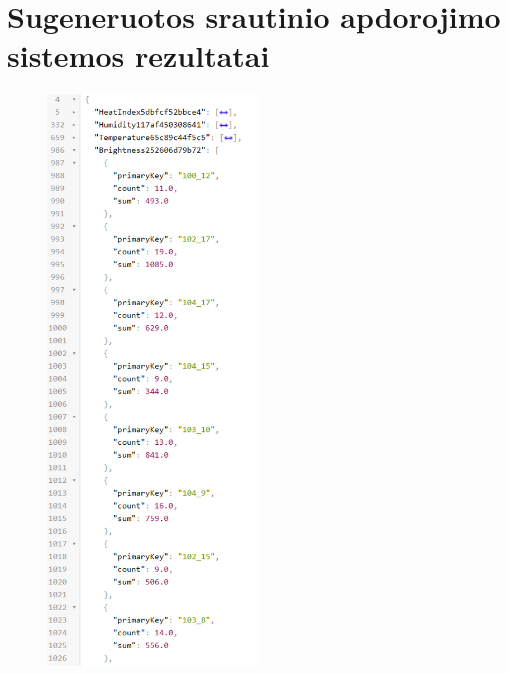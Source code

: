 \documentclass{VUMIFPSbakalaurinis}
\begin{document}
\section{Sugeneruotos srautinio apdorojimo sistemos rezultatai}\label{add:generated-data1}
\begin{figure}[H]
    \centering
    \includegraphics[width=0.5\textwidth]{img/topology-data-1.png}
    \label{img:generated-data}
\end{figure}
\end{document}
